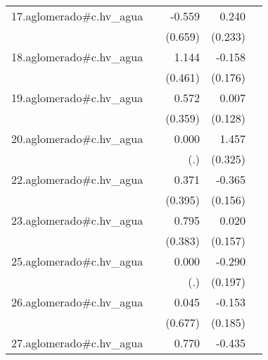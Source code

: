 {\begin{longtable}{l*{4}{D{.}{.}{-1}}}
\addlinespace
17.aglomerado#c.hv\_agua&                     &      -0.559         &       0.240         &                     \\
            &                     &     (0.659)         &     (0.233)         &                     \\
\addlinespace
18.aglomerado#c.hv\_agua&                     &       1.144\sym{*}  &      -0.158         &                     \\
            &                     &     (0.461)         &     (0.176)         &                     \\
\addlinespace
19.aglomerado#c.hv\_agua&                     &       0.572         &       0.007         &                     \\
            &                     &     (0.359)         &     (0.128)         &                     \\
\addlinespace
20.aglomerado#c.hv\_agua&                     &       0.000         &       1.457\sym{***}&                     \\
            &                     &         (.)         &     (0.325)         &                     \\
\addlinespace
22.aglomerado#c.hv\_agua&                     &       0.371         &      -0.365\sym{*}  &                     \\
            &                     &     (0.395)         &     (0.156)         &                     \\
\addlinespace
23.aglomerado#c.hv\_agua&                     &       0.795\sym{*}  &       0.020         &                     \\
            &                     &     (0.383)         &     (0.157)         &                     \\
\addlinespace
25.aglomerado#c.hv\_agua&                     &       0.000         &      -0.290         &                     \\
            &                     &         (.)         &     (0.197)         &                     \\
\addlinespace
26.aglomerado#c.hv\_agua&                     &       0.045         &      -0.153         &                     \\
            &                     &     (0.677)         &     (0.185)         &                     \\
\addlinespace
27.aglomerado#c.hv\_agua&                     &       0.770         &      -0.435\sym{*}  &                     \\

\end{longtable}}
